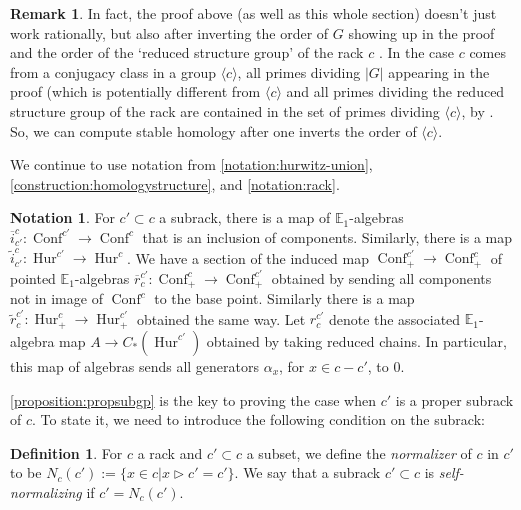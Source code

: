 \documentclass[12 pt]{amsart}
\theoremstyle{plain}
\theoremstyle{definition}
\newtheorem{definition}[theorem]{Definition}
\newtheorem{remark}[theorem]{Remark}
\newtheorem{notation}[theorem]{Notation}
\theoremstyle{remark}
\numberwithin{equation}{section}
\DeclareMathOperator\Hur{Hur}
\DeclareMathOperator\Conf{Conf}
\newcommand\EE{\mathbb{E}}
\begin{document}
\begin{remark}
	In fact, the proof above (as well as this whole section) doesn't just work rationally, but also after inverting the order of $G$ showing up in the proof and the order of the `reduced structure group' of the rack $c$ \cite[Section 2]{etingof2003rack}.
	In the case $c$ comes from a conjugacy class in a group $\langle c
	\rangle$, 
	all primes dividing $|G|$ appearing in the proof (which is potentially
		different from $\langle c \rangle$ and all primes dividing the reduced
	structure group of the rack are contained in the set of primes dividing
	$\langle c\rangle$, by \cite[Theorem 2.5]{wood:an-algebraic-lifting-invariant}. So, we can compute stable homology after one inverts the order
	of $\langle c \rangle$.
\end{remark}

We continue to use notation from \autoref{notation:hurwitz-union},
\autoref{construction:homologystructure}, and \autoref{notation:rack}.
\begin{notation}
	\label{notation:hur-c-to-c-prime}
	For $c' \subset c$ a subrack,
there is a map of $\EE_1$-algebras $\overline{i}_{c'}^{c}:\Conf^{c'} \to \Conf^{c}$ that is
an inclusion of components.
Similarly, there is a map $\tilde{i}_{c'}^{c}:\Hur^{c'} \to \Hur^{c}$.
We have a section of the induced map $\Conf^{c'}_+ \to \Conf^{c}_+$ of
pointed $\EE_1$-algebras $\overline{r}_{c}^{c'}:\Conf^{c}_+\to \Conf^{c'}_+$ 
obtained by sending all components not in image of $\Conf^{c}$ to the base
point. Similarly there is a map $\widetilde{r}_{c}^{c'}:\Hur^{c}_+\to \Hur^{c'}_+$ obtained the same way.
Let $r_{c}^{c'}$ denote the associated $\EE_1$-algebra map $A \to C_*(\Hur^{c'})$ obtained by taking reduced chains.
In particular, this map of algebras sends all generators $\alpha_x$, for $x \in
c-c'$, to $0$.
\end{notation}

\autoref{proposition:propsubgp} is the key to proving the case when $c'$ is a proper
subrack of $c$. To state it, we need to introduce the following condition on the subrack:

\begin{definition}\label{defn:self-normalizing}
	For $c$ a rack and $c' \subset c$ a subset, we define the
	{\em normalizer} of $c$ in $c'$ to be
	$N_c(c') := \{x \in c | x\triangleright c' = c'\}$.
	We say that a subrack $c' \subset c$ is \textit{self-normalizing} if $c'
	= N_c(c')$.
\end{definition}
\end{document}
